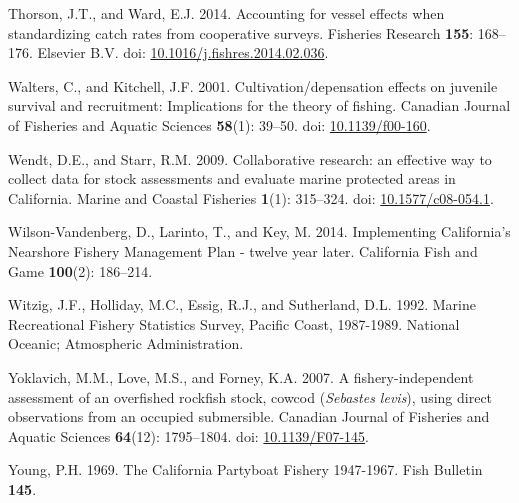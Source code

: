 \documentclass[11pt,
  english,
]{article}
\newlength{\cslhangindent}
\newenvironment{CSLReferences}[2] %
 {%
  \setlength{\parindent}{0pt}
  \ifodd #1 \everypar{\setlength{\hangindent}{\cslhangindent}}\ignorespaces\fi
  \ifnum #2 > 0
  \setlength{\parskip}{#2\baselineskip}
  \fi
 }%
 {}
\begin{document}
\begin{CSLReferences}{1}{0}
\leavevmode{}%
Thorson, J.T., and Ward, E.J. 2014. {Accounting for vessel effects when standardizing catch rates from cooperative surveys}. Fisheries Research \textbf{155}: 168--176. Elsevier B.V. doi: \href{https://doi.org/10.1016/j.fishres.2014.02.036}{10.1016/j.fishres.2014.02.036}.

\leavevmode{}%
Walters, C., and Kitchell, J.F. 2001. {Cultivation/depensation effects on juvenile survival and recruitment: Implications for the theory of fishing}. Canadian Journal of Fisheries and Aquatic Sciences \textbf{58}(1): 39--50. doi: \href{https://doi.org/10.1139/f00-160}{10.1139/f00-160}.

\leavevmode{}%
Wendt, D.E., and Starr, R.M. 2009. {Collaborative research: an effective way to collect data for stock assessments and evaluate marine protected areas in California}. Marine and Coastal Fisheries \textbf{1}(1): 315--324. doi: \href{https://doi.org/10.1577/c08-054.1}{10.1577/c08-054.1}.

\leavevmode{}%
Wilson-Vandenberg, D., Larinto, T., and Key, M. 2014. {Implementing California's Nearshore Fishery Management Plan - twelve year later}. California Fish and Game \textbf{100}(2): 186--214.

\leavevmode{}%
Witzig, J.F., Holliday, M.C., Essig, R.J., and Sutherland, D.L. 1992. {Marine Recreational Fishery Statistics Survey, Pacific Coast, 1987-1989}. National Oceanic; Atmospheric Administration.

\leavevmode{}%
Yoklavich, M.M., Love, M.S., and Forney, K.A. 2007. {A fishery-independent assessment of an overfished rockfish stock, cowcod (\emph{Sebastes levis}), using direct observations from an occupied submersible}. Canadian Journal of Fisheries and Aquatic Sciences \textbf{64}(12): 1795--1804. doi: \href{https://doi.org/10.1139/F07-145}{10.1139/F07-145}.

\leavevmode{}%
Young, P.H. 1969. {The California Partyboat Fishery 1947-1967}. Fish Bulletin \textbf{145}.

\end{CSLReferences}
\end{document}
